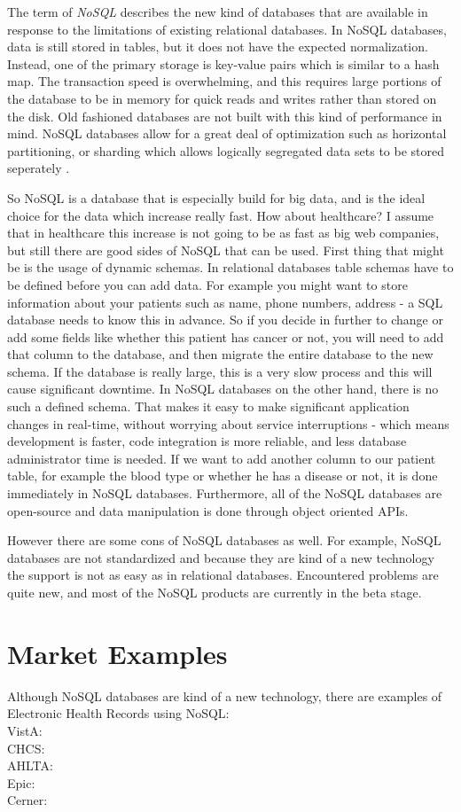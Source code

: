 \documentclass{article}
\begin{document}
The term of \emph{NoSQL} describes the new kind of databases that are available in response to the limitations of existing relational databases. In NoSQL databases, data is still stored in tables, but it does not have the expected normalization. Instead, one of the primary storage is key-value pairs which is similar to a hash map.  The transaction speed is overwhelming, and this requires large portions of the database to be in memory for quick reads and writes rather than stored on the disk. Old fashioned databases are not built with this kind of performance in mind. NoSQL databases allow for a great deal of optimization such as horizontal partitioning, or sharding which allows logically segregated data sets to be stored seperately \cite{clouddb9}. 


So NoSQL is a database that is especially build for big data, and is the ideal choice for the data which increase really fast. How about healthcare? I assume that in healthcare this increase is not going to be as fast as big web companies, but still there are good sides of NoSQL that can be used. First thing that might be is the usage of dynamic schemas. In relational databases table schemas have to be defined before you can add data. For example you might want to store information about your patients such as name, phone numbers, address - a SQL database needs to know this in advance. So if you decide in further to change or add some fields like whether this patient has cancer or not, you will need to add that column to the database, and then migrate the entire database to the new schema. If the database is really large, this is a very slow process and this will cause significant downtime. In NoSQL databases on the other hand, there is no such a defined schema. That makes it easy to make significant application changes in real-time, without worrying about service interruptions - which means development is faster, code integration is more reliable, and less database administrator time is needed. If we want to add another column to our patient table, for example the blood type or whether he has a disease or not, it is done immediately in NoSQL databases. Furthermore, all of the NoSQL databases are open-source and data manipulation is done through object oriented APIs. 

However there are some cons of NoSQL databases as well. For example, NoSQL databases are not standardized and because they are kind of a new technology the support is not as easy as in relational databases. Encountered problems are quite new, and most of the NoSQL products are currently in the beta stage. 

\section{Market Examples}
Although NoSQL databases are kind of a new technology, there are examples of Electronic Health Records using NoSQL: \\
VistA: \\
CHCS: \\
AHLTA:\\
Epic:\\
Cerner:\\



\end{document}
